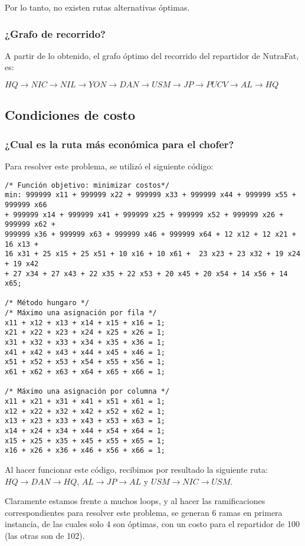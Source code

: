 \documentclass[12pt,letterpaper]{article}
\begin{document}
Por lo tanto, no existen rutas alternativas óptimas.

\subsubsection{¿Grafo de recorrido?}
A partir de lo obtenido, el grafo óptimo del recorrido del repartidor de NutraFat, es:

\begin{center}$HQ \to NIC \to NIL \to YON \to DAN \to USM \to JP \to PUCV \to AL \to HQ$\end{center}

\subsection{Condiciones de costo}
\subsubsection{¿Cual es la ruta más económica para el chofer?}
Para resolver este problema, se utilizó el siguiente código:
\begin{verbatim}
/* Función objetivo: minimizar costos*/
min: 999999 x11 + 999999 x22 + 999999 x33 + 999999 x44 + 999999 x55 + 999999 x66
+ 999999 x14 + 999999 x41 + 999999 x25 + 999999 x52 + 999999 x26 + 999999 x62 +
999999 x36 + 999999 x63 + 999999 x46 + 999999 x64 + 12 x12 + 12 x21 + 16 x13 +
16 x31 + 25 x15 + 25 x51 + 10 x16 + 10 x61 +  23 x23 + 23 x32 + 19 x24 + 19 x42
+ 27 x34 + 27 x43 + 22 x35 + 22 x53 + 20 x45 + 20 x54 + 14 x56 + 14 x65;

/* Método hungaro */
/* Máximo una asignación por fila */
x11 + x12 + x13 + x14 + x15 + x16 = 1;
x21 + x22 + x23 + x24 + x25 + x26 = 1;
x31 + x32 + x33 + x34 + x35 + x36 = 1;
x41 + x42 + x43 + x44 + x45 + x46 = 1;
x51 + x52 + x53 + x54 + x55 + x56 = 1;
x61 + x62 + x63 + x64 + x65 + x66 = 1;

/* Máximo una asignación por columna */
x11 + x21 + x31 + x41 + x51 + x61 = 1;
x12 + x22 + x32 + x42 + x52 + x62 = 1;
x13 + x23 + x33 + x43 + x53 + x63 = 1;
x14 + x24 + x34 + x44 + x54 + x64 = 1;
x15 + x25 + x35 + x45 + x55 + x65 = 1;
x16 + x26 + x36 + x46 + x56 + x66 = 1;
\end{verbatim}

Al hacer funcionar este código, recibimos por resultado la siguiente ruta: $HQ \to DAN \to HQ$, $AL \to JP \to AL$ y $USM \to NIC \to USM$.

Claramente estamos frente a muchos loops, y al hacer las ramificaciones correspondientes para resolver este problema, se generan 6 ramas en primera instancia, de las cuales solo 4 son óptimas, con un costo para el repartidor de 100 (las otras son de 102).
\end{document}

